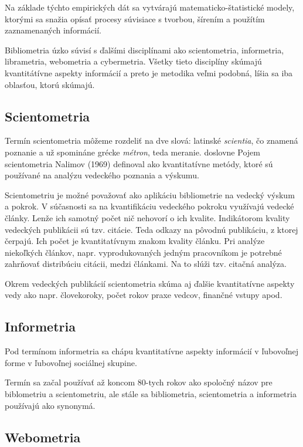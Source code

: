 Na základe týchto empirických dát sa vytvárajú matematicko-štatistické modely,
ktorými sa snažia opísať procesy súvisiace s tvorbou, šírením a použítím
zaznamenaných informácií.

Bibliometria úzko súvisí s ďalšími disciplínami ako scientometria, informetria,
librametria, webometria a cybermetria.  Všetky tieto disciplíny skúmajú
kvantitátívne aspekty informácií a preto je metodika veľmi podobná, líšia sa iba
oblasťou, ktorú skúmajú.


\subsection{Scientometria}

Termín scientometria môžeme rozdeliť na dve slová: latinské {\em scientia}, čo znamená
poznanie a už spomináne grécke {\em métron}, teda meranie.  doslovne  Pojem scientometria Nalimov (1969) definoval ako kvantitatívne
metódy, ktoré sú používané na analýzu vedeckého poznania a výskumu. 

Scientometriu je možné považovať ako aplikáciu bibliometrie na vedecký výskum a
pokrok.  V súčasnosti sa na kvantifikáciu vedeckého pokroku využívajú vedecké
články.  Lenže ich samotný počet nič nehovorí o ich kvalite.  Indikátorom
kvality vedeckých publikácii sú tzv. citácie.  Teda odkazy na pôvodnú
publikáciu, z ktorej čerpajú.  Ich počet je kvantitatívnym znakom kvality
článku.  Pri analýze niekoľkých článkov, napr. vyprodukovaných jedným
pracovníkom je potrebné zahrňovať distribúciu citácii, medzi článkami.  Na to
slúži tzv. citačná analýza.

Okrem vedeckých publikácií scientometria skúma aj ďalšie kvantitatívne aspekty
vedy ako napr. človekoroky, počet rokov praxe vedcov, finančné vstupy apod.
\citet{Bellis2009}


\subsection{Informetria}

Pod termínom informetria sa chápu kvantitatívne aspekty informácií v ľubovoľnej
forme v ľubovoľnej sociálnej skupine.

Termín sa začal používať až koncom 80-tych rokov ako spoločný názov pre
biblometriu a scientometriu, ale stále sa bibliometria, scientometria a
informetria používajú ako synonymá.


\subsection{Webometria}


